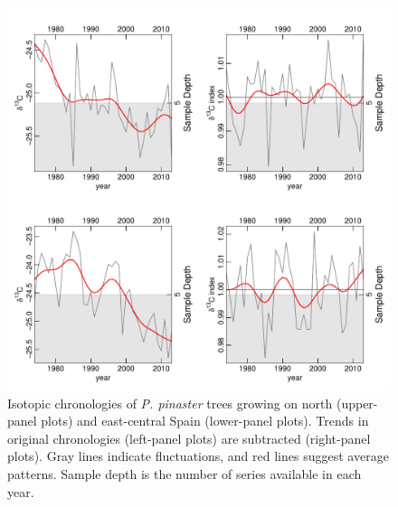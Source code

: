 \documentclass[review,authoryear]{elsarticle}
\begin{document}
\clearpage
\begin{figure}\centering
\includegraphics[scale=0.7,trim=20mm 0mm 20mm 0mm]{ideltas} 
\caption{Isotopic chronologies of \textit{P. pinaster} trees growing
  on north (upper-panel plots) and east-central Spain (lower-panel
  plots). Trends in original chronologies (left-panel plots) are
  subtracted (right-panel plots). Gray lines indicate fluctuations,
  and red lines suggest average patterns. Sample depth is the number
  of series available in each year.}
\label{fig:RWIs} 
\end{figure}
\end{document}
